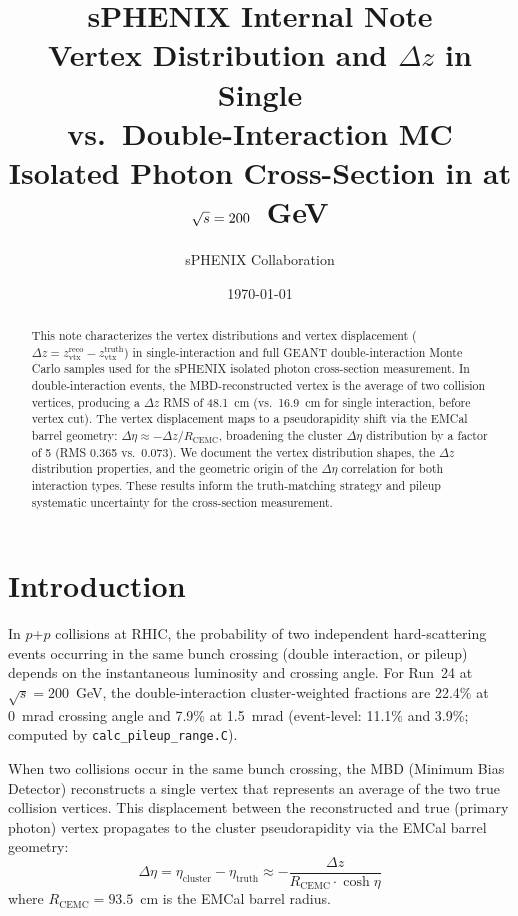 \documentclass[11pt,letterpaper]{article}
\title{%
  \vspace{-1cm}
  {\large \textbf{sPHENIX Internal Note}}\\[0.5cm]
  {\LARGE \textbf{Vertex Distribution and $\Delta z$ in Single\\
  vs.\ Double-Interaction MC}}\\[0.3cm]
  {\large Isolated Photon Cross-Section in \pp{} at $\sqs = 200$~GeV}
}
\author{sPHENIX Collaboration}
\date{\today}
\newcommand{\pp}{\mbox{$p$+$p$}}
\newcommand{\sqs}{\mbox{$\sqrt{s}$}}
\newcommand{\Rcemc}{\ensuremath{R_{\text{CEMC}}}}
\begin{document}
\maketitle

\begin{abstract}
This note characterizes the vertex distributions and vertex displacement
($\Delta z = z_{\text{vtx}}^{\text{reco}} - z_{\text{vtx}}^{\text{truth}}$)
in single-interaction and full GEANT double-interaction Monte Carlo
samples used for the sPHENIX isolated photon cross-section measurement.
In double-interaction events, the MBD-reconstructed vertex is the average
of two collision vertices, producing a $\Delta z$ RMS of 48.1~cm (vs.\
16.9~cm for single interaction, before vertex cut). The vertex displacement
maps to a pseudorapidity shift via the EMCal barrel geometry:
$\Delta\eta \approx -\Delta z / \Rcemc$, broadening the cluster
$\Delta\eta$ distribution by a factor of 5 (RMS 0.365 vs.\ 0.073).
We document the vertex distribution shapes, the $\Delta z$ distribution
properties, and the geometric origin of the $\Delta\eta$ correlation
for both interaction types. These results inform the truth-matching
strategy and pileup systematic uncertainty for the cross-section measurement.
\end{abstract}

\tableofcontents
\newpage

\section{Introduction}
\label{sec:intro}

In \pp{} collisions at RHIC, the probability of two independent
hard-scattering events occurring in the same bunch crossing (double
interaction, or pileup) depends on the instantaneous luminosity and
crossing angle. For Run~24 at $\sqs = 200$~GeV, the double-interaction
cluster-weighted fractions are 22.4\% at 0~mrad crossing angle and 7.9\% at 1.5~mrad
(event-level: 11.1\% and 3.9\%; computed by \texttt{calc\_pileup\_range.C}).

When two collisions occur in the same bunch crossing, the MBD (Minimum
Bias Detector) reconstructs a single vertex that represents an average
of the two true collision vertices. This displacement between the
reconstructed and true (primary photon) vertex propagates to the
cluster pseudorapidity via the EMCal barrel geometry:
\begin{equation}
  \Delta\eta = \eta_{\text{cluster}} - \eta_{\text{truth}}
    \approx -\frac{\Delta z}{\Rcemc \cdot \cosh\eta}
  \label{eq:deta_dz}
\end{equation}
where $\Rcemc = 93.5$~cm is the EMCal barrel radius.
\end{document}
